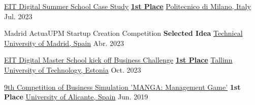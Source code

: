 



\begin{cvhonors}

\cvhonor
{\href{https://www.instagram.com/p/Cu9dOXZswlK/?img_index=9}{EIT Digital Summer School Case Study}} %
{\href{http://bit.ly/3u6Lm2b}{\hspace*{1mm}\textbf{1st Place}}} %
{\href{https://www.polimi.it/}{Politecnico di Milano, Italy}} %
{Jul. 2023} %

\cvhonor
{Madrid ActuaUPM Startup Creation Competition} %
{\hspace*{1mm}\textbf{Selected Idea}} %
{\href{https://www.cedint.upm.es/en/article/take-part-20th-actuaupm-competition}{Technical University of Madrid, Spain}} %
{Abr. 2023} %

\cvhonor
{\href{https://www.eitdigital.eu/newsroom/news/2022/eit-digital-master-school-kicks-off-academic-year-2022/}{EIT Digital Master School kick off Business Challenge}} %
{\hspace*{1mm}\href{https://bit.ly/4aH8i7z}{\textbf{1st Place}}} %
{\href{https://taltech.ee/en/}{Tallinn University of Technology, Estonia}} %
{Oct. 2023} %

\cvhonor
{\href{https://economicas.ua.es/es/actividades-y-eventos/juego-de-simulacion/ediciones-anteriores/juego-de-simulacion-empresarial-2018-19.html}{9th Competition of Business Simulation 'MANGA: Management Game'}} %
{\hspace*{1mm}\textbf{1st Place}} %
{\href{https://www.ua.es/en/}{University of Alicante, Spain}} %
{Jun. 2019} %

\end{cvhonors}



